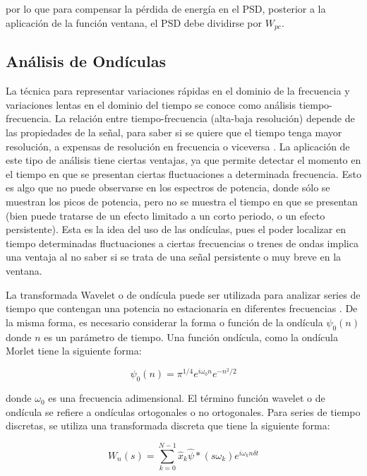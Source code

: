 por lo que para compensar la pérdida de energía en el PSD, posterior a la aplicación de la función ventana, el PSD debe dividirse por $W_{pc}$.
\vspace{1 em}

\subsection{Análisis de Ondículas}

La técnica para representar variaciones rápidas en el dominio de la frecuencia y variaciones lentas en el dominio del tiempo se conoce como análisis tiempo-frecuencia. La relación entre tiempo-frecuencia (alta-baja resolución) depende de las propiedades de la señal, para saber si se quiere que el tiempo tenga mayor resolución, a expensas de resolución en frecuencia o viceversa \cite{book_analysis_Method_multiSp_data}. La aplicación de este tipo de análisis tiene ciertas ventajas, ya que permite detectar el momento en el tiempo en que se presentan ciertas fluctuaciones a determinada frecuencia. Esto es algo que no puede observarse en los espectros de potencia, donde sólo se muestran los picos de potencia, pero no se muestra el tiempo en que se presentan (bien puede tratarse de un efecto limitado a un corto periodo, o un efecto persistente). Esta es la idea del uso de las ondículas, pues el poder localizar en tiempo determinadas fluctuaciones a ciertas frecuencias o trenes de ondas implica una ventaja al no saber si se trata de una señal persistente o muy breve en la ventana. 
\vspace{1 em}

La transformada Wavelet o de ondícula puede ser utilizada para analizar series de tiempo que contengan una potencia no estacionaria en diferentes frecuencias \cite{guide_wavelet_routines}. De la misma forma, es necesario considerar la forma o función de la ondícula $\psi_0(n)$ donde $n$ es un parámetro de tiempo. Una función ondícula, como la ondícula Morlet tiene la siguiente forma:

\begin{equation}
    \psi_0(n) = \pi^{1/4}e^{i \omega_0 n} e ^{-n^2/2}
\end{equation}

donde $\omega_0$ es una frecuencia adimensional. El término función wavelet o de ondícula se refiere a ondículas ortogonales o no ortogonales. Para series de tiempo discretas, se utiliza una transformada discreta que tiene la siguiente forma: 

\begin{equation}
    W_n(s) = \sum_{k = 0}^{N-1} \hat{x}_k \hat{\psi} \ast (s \omega_k) e^{i \omega_k n {\displaystyle \delta} t}
\end{equation}

